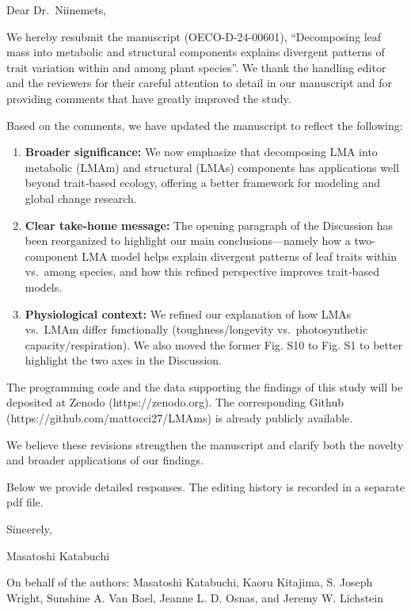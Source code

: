 \documentclass[
  12pt,
  letterpaper,
  DIV=11,
  numbers=noendperiod]{scrartcl}
\author{Masatoshi Katabuchi}
\date{2025-02-13}
\begin{document}
Dear Dr.~Niinemets,

We hereby resubmit the manuscript (OECO-D-24-00601), ``Decomposing leaf
mass into metabolic and structural components explains divergent
patterns of trait variation within and among plant species''. We thank
the handling editor and the reviewers for their careful attention to
detail in our manuscript and for providing comments that have greatly
improved the study.

Based on the comments, we have updated the manuscript to reflect the
following:

\begin{enumerate}
\def\labelenumi{\arabic{enumi}.}
\item
  \textbf{Broader significance:} We now emphasize that decomposing LMA
  into metabolic (LMAm) and structural (LMAs) components has
  applications well beyond trait‐based ecology, offering a better
  framework for modeling and global change research.
\item
  \textbf{Clear take‐home message:} The opening paragraph of the
  Discussion has been reorganized to highlight our main
  conclusions---namely how a two‐component LMA model helps explain
  divergent patterns of leaf traits within vs.~among species, and how
  this refined perspective improves trait‐based models.
\item
  \textbf{Physiological context:} We refined our explanation of how LMAs
  vs.~LMAm differ functionally (toughness/longevity vs.~photosynthetic
  capacity/respiration). We also moved the former Fig. S10 to Fig. S1 to
  better highlight the two axes in the Discussion.
\end{enumerate}

The programming code and the data supporting the findings of this study
will be deposited at Zenodo (https://zenodo.org). The corresponding
Github (https://github.com/mattocci27/LMAms) is already publicly
available.

We believe these revisions strengthen the manuscript and clarify both
the novelty and broader applications of our findings.

Below we provide detailed responses. The editing history is recorded in
a separate pdf file.

Sincerely,

Masatoshi Katabuchi

On behalf of the authors: Masatoshi Katabuchi, Kaoru Kitajima, S. Joseph
Wright, Sunshine A. Van Bael, Jeanne L. D. Osnas, and Jeremy W.
Lichstein
\end{document}
